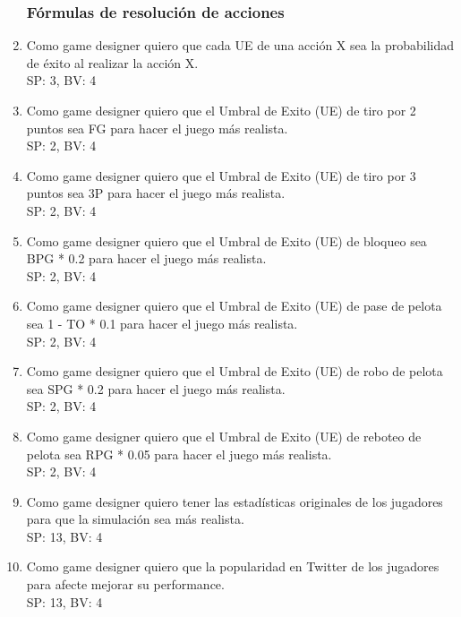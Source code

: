 \documentclass[a4paper, 10pt, twoside]{article}
\begin{document}
\begin{enumerate}
    \subsubsection{F\'ormulas de resoluci\'on de acciones}
    \item Como game designer quiero que cada UE de una acci\'on X sea la probabilidad de \'exito al realizar la acci\'on X.
    \\SP: 3, BV: 4
    \item Como game designer quiero que el Umbral de Exito (UE) de tiro por 2 puntos sea FG para hacer el juego m\'as realista.
    \\SP: 2, BV: 4
    \item Como game designer quiero que el Umbral de Exito (UE) de tiro por 3 puntos sea 3P para hacer el juego m\'as realista.
    \\SP: 2, BV: 4
    \item Como game designer quiero que el Umbral de Exito (UE) de bloqueo sea  BPG * 0.2 para hacer el juego m\'as realista.
    \\SP: 2, BV: 4
    \item Como game designer quiero que el Umbral de Exito (UE) de pase de pelota sea 1 - TO * 0.1 para hacer el juego m\'as realista.
    \\SP: 2, BV: 4
    \item Como game designer quiero que el Umbral de Exito (UE) de robo de pelota sea SPG * 0.2 para hacer el juego m\'as realista.
    \\SP: 2, BV: 4
    \item Como game designer quiero que el Umbral de Exito (UE) de reboteo de pelota sea RPG * 0.05 para hacer el juego m\'as realista.
    \\SP: 2, BV: 4
    \item Como game designer quiero tener las estad\'isticas originales de los jugadores para que la simulaci\'on sea m\'as realista.
    \\SP: 13, BV: 4
    \item Como game designer quiero que la popularidad en Twitter de los jugadores para afecte mejorar su performance.
    \\SP: 13, BV: 4

\end{enumerate}
\end{document}
